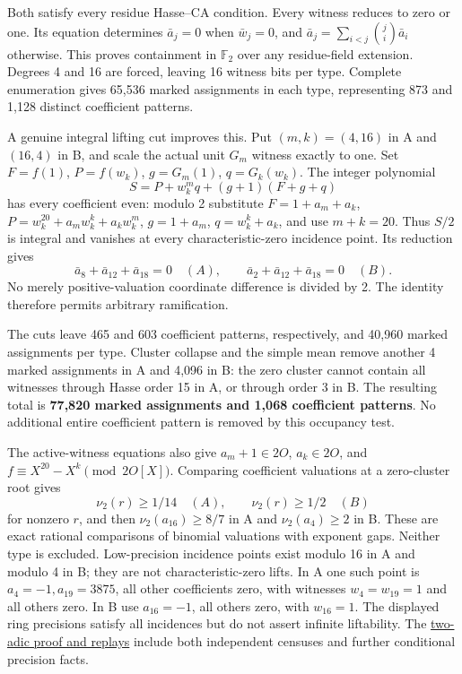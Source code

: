 \documentclass[
  british,
  10pt,
]{article}
\begin{document}
Both satisfy every residue Hasse--CA condition. Every witness reduces to
zero or one. Its equation determines \(\bar a_j=0\) when \(\bar w_j=0\),
and \(\bar a_j=\sum_{i<j}\binom ji\bar a_i\) otherwise. This proves
containment in \(\mathbb F_2\) over any residue-field extension. Degrees
4 and 16 are forced, leaving 16 witness bits per type. Complete
enumeration gives 65,536 marked assignments in each type, representing
873 and 1,128 distinct coefficient patterns.

A genuine integral lifting cut improves this. Put \((m,k)=(4,16)\) in A
and \((16,4)\) in B, and scale the actual unit \(G_m\) witness exactly
to one. Set \(F=f(1)\), \(P=f(w_k)\), \(g=G_m(1)\), \(q=G_k(w_k)\). The
integer polynomial \[
 S=P+w_k^mq+(g+1)(F+g+q)                                  \tag{D2}
\] has every coefficient even: modulo 2 substitute \(F=1+a_m+a_k\),
\(P=w_k^{20}+a_mw_k^k+a_kw_k^m\), \(g=1+a_m\), \(q=w_k^k+a_k\), and use
\(m+k=20\). Thus \(S/2\) is integral and vanishes at every
characteristic-zero incidence point. Its reduction gives \[
 \bar a_8+\bar a_{12}+\bar a_{18}=0\quad(A),\qquad
 \bar a_2+\bar a_{12}+\bar a_{18}=0\quad(B).                \tag{D3}
\] No merely positive-valuation coordinate difference is divided by 2.
The identity therefore permits arbitrary ramification.

The cuts leave 465 and 603 coefficient patterns, respectively, and
40,960 marked assignments per type. Cluster collapse and the simple mean
remove another 4 marked assignments in A and 4,096 in B: the zero
cluster cannot contain all witnesses through Hasse order 15 in A, or
through order 3 in B. The resulting total is \textbf{77,820 marked
assignments and 1,068 coefficient patterns}. No additional entire
coefficient pattern is removed by this occupancy test.

The active-witness equations also give \(a_m+1\in2O\), \(a_k\in2O\), and
\(f\equiv X^{20}-X^k\pmod{2O[X]}\). Comparing coefficient valuations at
a zero-cluster root gives \[
 \nu_2(r)\ge1/14\quad(A),\qquad \nu_2(r)\ge1/2\quad(B)
\] for nonzero \(r\), and then \(\nu_2(a_{16})\ge8/7\) in A and
\(\nu_2(a_4)\ge2\) in B. These are exact rational comparisons of
binomial valuations with exponent gaps. Neither type is excluded.
Low-precision incidence points exist modulo 16 in A and modulo 4 in B;
they are not characteristic-zero lifts. In A one such point is
\(a_4=-1,a_{19}=3875\), all other coefficients zero, with witnesses
\(w_4=w_{19}=1\) and all others zero. In B use \(a_{16}=-1\), all others
zero, with \(w_{16}=1\). The displayed ring precisions satisfy all
incidences but do not assert infinite liftability. The
\href{evidence/full/two_adic/REDUCTION_AND_LIFTING.md}{two-adic proof
and replays} include both independent censuses and further conditional
precision facts.
\end{document}
